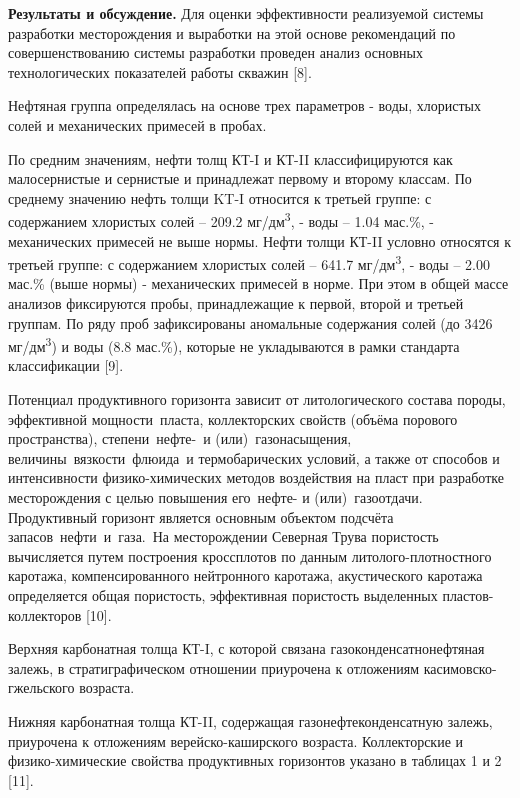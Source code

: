 \begin{multicols}{2}
{\bfseries Результаты и обсуждение.} Для оценки эффективности реализуемой
системы разработки месторождения и выработки на этой основе рекомендаций
по совершенствованию системы разработки проведен анализ основных
технологических показателей работы скважин {[}8{]}.

Нефтяная группа определялась на основе трех параметров - воды, хлористых
солей и механических примесей в пробах.

По средним значениям, нефти толщ КТ-I и КТ-II классифицируются как
малосернистые и сернистые и принадлежат первому и второму классам. По
среднему значению нефть толщи KT-I относится к третьей группе: с
содержанием хлористых солей -- 209.2 мг/дм\textsuperscript{3}, - воды --
1.04 мас.\%, - механических примесей не выше нормы. Нефти толщи КТ-II
условно относятся к третьей группе: с содержанием хлористых солей --
641.7 мг/дм\textsuperscript{3}, - воды -- 2.00 мас.\% (выше нормы) -
механических примесей в норме. При этом в общей массе анализов
фиксируются пробы, принадлежащие к первой, второй и третьей группам. По
ряду проб зафиксированы аномальные содержания солей (до 3426
мг/дм\textsuperscript{3}) и воды (8.8 мас.\%), которые не укладываются в
рамки стандарта классификации {[}9{]}.

Потенциал продуктивного горизонта зависит от литологического состава
породы, эффективной мощности~пласта, коллекторских свойств (объёма
порового пространства), степени~нефте-~и (или)~газонасыщения,
величины~вязкости~флюида~и термобарических условий, а также от способов
и интенсивности физико-химических методов воздействия на пласт при
разработке месторождения с целью повышения его~нефте- и
(или)~газоотдачи. Продуктивный горизонт является основным объектом
подсчёта запасов~нефти~и~газа.~На месторождении Северная Трува
пористость вычисляется путем построения кроссплотов по данным
литолого-плотностного каротажа, компенсированного нейтронного каротажа,
акустического каротажа определяется общая пористость, эффективная
пористость выделенных пластов-коллекторов {[}10{]}.

Верхняя карбонатная толща КТ-I, с которой связана
газоконденсатнонефтяная залежь, в стратиграфическом отношении приурочена
к отложениям касимовско-гжельского возраста.

Нижняя карбонатная толща КТ-II, содержащая газонефтеконденсатную залежь,
приурочена к отложениям верейско-каширского возраста. Коллекторские и
физико-химические свойства продуктивных горизонтов указано в таблицах 1
и 2 {[}11{]}.
\end{multicols}

